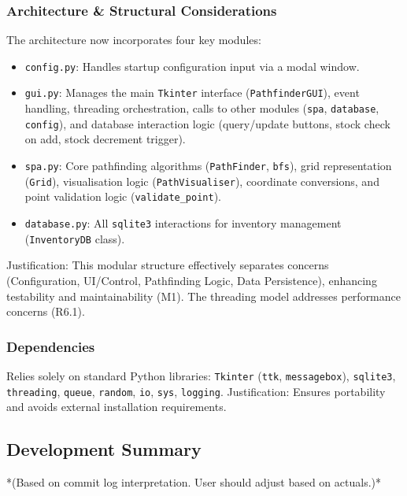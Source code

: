 \subsubsection{Architecture \& Structural Considerations}

The architecture now incorporates four key modules:
\begin{itemize}
	\item \verb|config.py|: Handles startup configuration input via a modal window.
	\item \verb|gui.py|: Manages the main \verb|Tkinter| interface (\verb|PathfinderGUI|), event handling, threading orchestration, calls to other modules (\verb|spa|, \verb|database|, \verb|config|), and database interaction logic (query/update buttons, stock check on add, stock decrement trigger).
	\item \verb|spa.py|: Core pathfinding algorithms (\verb|PathFinder|, \verb|bfs|), grid representation (\verb|Grid|), visualisation logic (\verb|PathVisualiser|), coordinate conversions, and point validation logic (\verb|validate_point|).
	\item \verb|database.py|: All \verb|sqlite3| interactions for inventory management (\verb|InventoryDB| class).
\end{itemize}
Justification: This modular structure effectively separates concerns (Configuration, UI/Control, Pathfinding Logic, Data Persistence), enhancing testability and maintainability (M1). The threading model addresses performance concerns (R6.1).

\subsubsection{Dependencies}
Relies solely on standard Python libraries: \verb|Tkinter| (\verb|ttk|, \verb|messagebox|), \verb|sqlite3|, \verb|threading|, \verb|queue|, \verb|random|, \verb|io|, \verb|sys|, \verb|logging|. Justification: Ensures portability and avoids external installation requirements.

\newpage
\subsection{Development Summary}

*(Based on commit log interpretation. User should adjust based on actuals.)*

